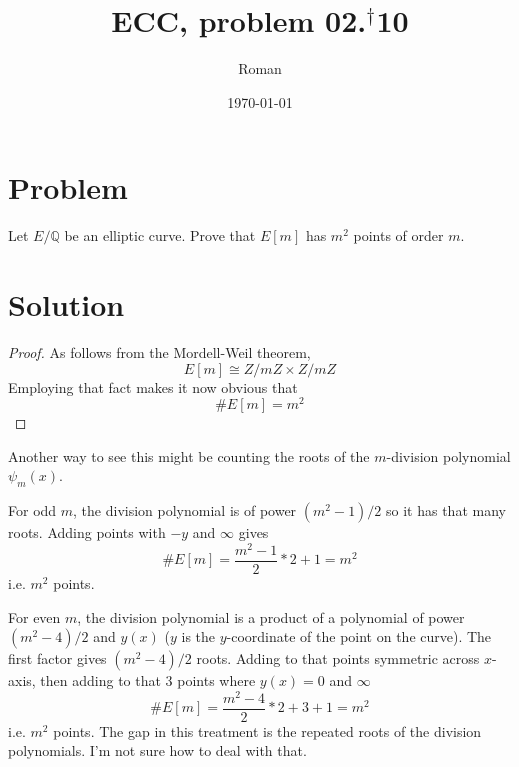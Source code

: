 \documentclass[12pt]{article}
\title{ECC, problem 02.$^\dagger$10}
\author{Roman}
\date{\today}
\begin{document}
\maketitle

\section*{Problem}

Let $E/\mathbb{Q}$ be an elliptic curve. Prove that $E[m]$ has $m^2$ points of order $m$.

\pagebreak

\section*{Solution}
\begin{proof}

As follows from the Mordell-Weil theorem,
\begin{equation}
    E[m] \cong Z/mZ \times Z/mZ
\end{equation}
Employing that fact makes it now obvious that
\begin{equation}
    \#E[m] = m^2
\end{equation}

\end{proof}

Another way to see this might be counting the roots of the $m$-division polynomial $\psi_m(x)$.


For odd $m$, the division polynomial is of power $(m^2-1)/2$ so it has that many roots. Adding points with $-y$ and $\infty$ gives 
\begin{equation}
    \#E[m] = \frac{m^2-1}{2} * 2 + 1 = m^2
\end{equation}
i.e. $m^2$ points.

For even $m$, the division polynomial is a product of a polynomial of power $(m^2-4)/2$ and $y(x)$ ($y$ is the $y$-coordinate of the point on the curve).
The first factor gives $(m^2-4)/2$ roots. Adding to that points symmetric across $x$-axis, then adding to that $3$ points where $y(x) = 0$ and $\infty$
\begin{equation}
    \#E[m] = \frac{m^2-4}{2} * 2 + 3 + 1 = m^2
\end{equation}
i.e. $m^2$ points. The gap in this treatment is the repeated roots of the division polynomials. I'm not sure how to deal with that.
\end{document}
